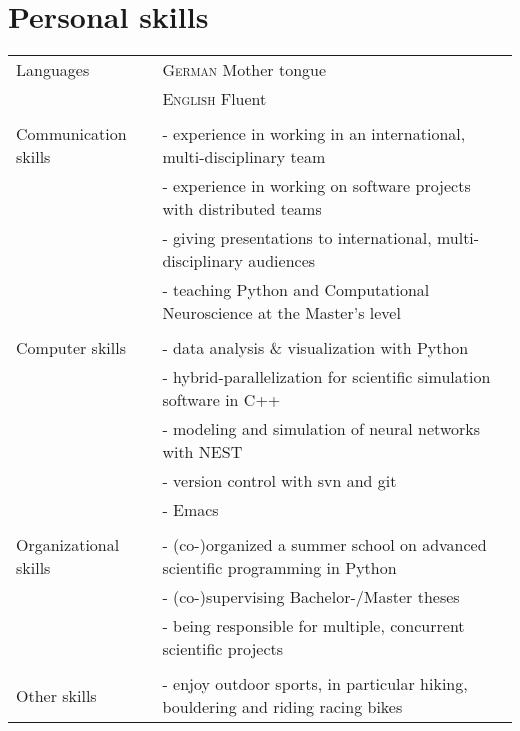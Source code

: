 \documentclass[a4paper,10pt]{article}
\begin{document}
\section{Personal skills}

\begin{tabular}{>{\hfill}p{3.3cm}|p{10.4cm}}
Languages & \textsc{German} Mother tongue \\
& \textsc{English} Fluent \\
  \multicolumn{2}{c}{} \\
Communication skills & - experience in working in an international, multi-disciplinary team \\
& - experience in working on software projects with distributed teams \\
& - giving presentations to international, multi-disciplinary audiences \\
& - teaching Python and Computational Neuroscience at the Master's level \\
  \multicolumn{2}{c}{} \\
Computer skills & - data analysis \& visualization with Python \\
& - hybrid-parallelization for scientific simulation software in C++ \\
& - modeling and simulation of neural networks with NEST \\
& - version control with svn and git \\
& - Emacs \\
  \multicolumn{2}{c}{} \\
Organizational skills & - (co-)organized a summer school on advanced scientific programming in Python \\
& - (co-)supervising Bachelor-/Master theses \\
& - being responsible for multiple, concurrent scientific projects \\
  \multicolumn{2}{c}{} \\
Other skills & - enjoy outdoor sports, in particular hiking, bouldering and riding racing bikes
\end{tabular}
\end{document}
